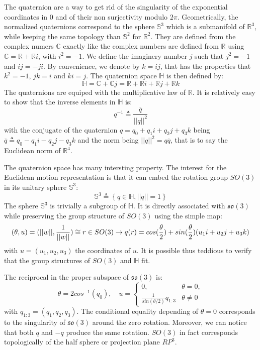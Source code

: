 \documentclass{book}
\begin{document}
The quaternion are a way to get rid of the singularity of the exponential coordinates in 0 and of their non surjectivity modulo $2\pi$. Geometrically, the normalized quaternions correspond to the sphere $\mathbb{S}^3$ which is a submanifold of $\mathbb{R}^3$, while keeping the same topology than $\mathbb{S}^2$ for $\mathbb{R}^2$. They are defined from the complex numers $\mathbb{C}$ exactly like the complex numbers are defined from $\mathbb{R}$ using $\mathbb{C} = \mathbb{R} + \mathbb{R}i $, with $i^2 = -1$. We define the imaginery number $j$ such that $j^2 = -1$ and $ij = -ji$. By convenience, we denote by $k = ij$, that has the properties that $k^2=-1$, $jk = i$ and $ki=j$. The quaternion space $\mathbb{H}$ is then defined by:
\[ \mathbb{H} = \mathbb{C} + \mathbb{C} j 
= \mathbb{R} + \mathbb{R} i + \mathbb{R}j + \mathbb{R} k \]
The quaternions are equiped with the multiplicative law of $\mathbb{R}$. It is relatively easy to show that the inverse elements in $\mathbb{H}$ is:
\[ q^{-1} \triangleq \frac{\overline{q}}{||q||^2} \]
with the  conjugate of the quaternion $q=q_0 + q_1 i + q_2 j + q_3 k$ being $\overline{q} \triangleq q_0 - q_1 i - q_2 j -q_3 k$ and the norm being $||q||^2 = q \overline{q}$, that is to say the Euclidean norm of $\mathbb{R}^4$.

The quaternion space has many intersting property. The interest for the Euclidean motion representation is that it can embed the rotation group $SO(3)$ in its unitary sphere $\mathbb{S}^3$:
\[ \mathbb{S}^3 \triangleq \left\{ q \in \mathbb{H}, ||q|| = 1 \right\} \]
The sphere $\mathbb{S}^3$ is trivially a subgroup of $\mathbb{H}$. It is directly associated with $\mathfrak{so}(3)$ while preserving the group structure of $SO(3)$ using the simple map:
\[ (\theta,u) = (||w||,\frac{1}{||w||}) \cong r \in SO(3) \rightarrow q(r) = cos(\frac{\theta}{2}) + sin(\frac{\theta}{2})(u_1 i + u_2 j + u_3 k) \]
with $u = (u_1,u_2,u_3)$ the coordinates of $u$. It is possible thus teddious to verify that the group structures of $SO(3)$ and $\mathbb{H}$ fit. 

The reciprocal in the proper subspace of $\mathfrak{so}(3)$ is:
\[
\theta = 2 cos^{-1} (q_0),
\quad u = \left\{  \begin{array}{ll} 0, & \theta = 0, \\ \frac{1}{sin(\theta/2)} q_{1:3} & \theta \neq 0 \end{array}\right. \]
with $q_{1:3} = (q_1,q_2,q_3)$. The conditional equality depending of $\theta=0$ corresponds to the singularity of $\mathfrak{so}(3)$ around the zero rotation. Moreover, we can notice that both $q$ and $-q$ produce the same rotation. $SO(3)$ in fact corresponds topologically of the half sphere or projection plane $RP^3$.
\end{document}
